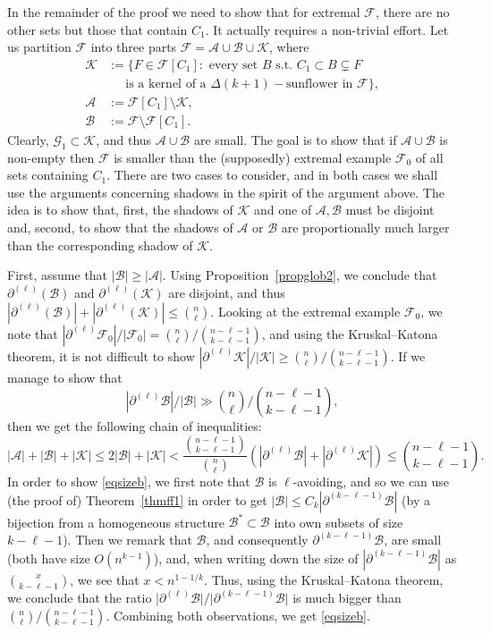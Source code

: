 \documentclass[graybox]{svmult}
\renewcommand{\le}{\leqslant}
\renewcommand{\ge}{\geqslant}
\newcommand{\ff}{\mathcal{F}}
\newcommand{\m}{\mathcal}
\begin{document}
In the remainder of the proof we need to show that for extremal $\ff$, there are no other sets but those that contain $C_1$. It actually requires a non-trivial effort. Let us partition $\ff$ into three parts $\ff = \mathcal A\cup \mathcal B\cup \mathcal K$, where \begin{align*}\mathcal K&:=\{F\in \ff[C_1]: \text{ every set }B\text { s.t. } C_1\subset B\subsetneq F \\ &\ \ \ \ \ \text{ is a kernel of a }\Delta(k+1)-\text{sunflower in } \ff\},\\
\m A&:=\ff[C_1]\setminus \m K,\\
\m B&:=\ff\setminus \ff[C_1].
\end{align*}
Clearly, $\m G_1\subset \m K$, and thus $\m A\cup \m B$ are small. The goal is to show that if $\m A\cup \m B$ is non-empty then $\ff$ is smaller than the (supposedly) extremal example $\ff_0$ of all sets containing $C_1$. There are two cases to consider, and in both cases we shall use the arguments concerning shadows in the spirit of the argument above. The idea is to show that, first, the shadows of $\m K$ and one of $\m A, \m B$ must be disjoint and, second, to show that the shadows of $\m A$ or $\m B$ are proportionally much larger than the corresponding shadow of $\m K$.

First, assume that $|\m B|\ge |\m A|$. Using Proposition~\ref{propglob2}, we conclude that $\partial^{(\ell)}(\m B)$ and $\partial^{(\ell)}(\m K)$ are disjoint, and thus $|\partial^{(\ell)}(\m B)| +|\partial^{(\ell)}(\m K)|\le {n\choose \ell}$. Looking at the extremal example $\ff_0$, we note that $|\partial^{(\ell)}\ff_0|/|\ff_0| = {n\choose \ell}/{n-\ell-1\choose k-\ell-1}$, and using the Kruskal--Katona theorem, it is not difficult to show  $|\partial^{(\ell)}\m K|/|\m K| \ge {n\choose \ell}/{n-\ell-1\choose k-\ell-1}$. If we manage to show that \begin{equation}\label{eqsizeb}|\partial^{(\ell)}\m B|/|\m B| \gg {n\choose \ell}/{n-\ell-1\choose k-\ell-1},\end{equation} then we get the following chain of inequalities:
$$|\m A|+|\m B|+|\m K|\le 2|\m B|+|\m K|<\frac{{n-\ell-1\choose k-\ell-1}}{{n\choose \ell}}\left(|\partial^{(\ell)}\m B|+|\partial^{(\ell)}\m K|\right)\le {n-\ell-1\choose k-\ell-1}.$$
In order to show \eqref{eqsizeb}, we first note that $\m B$ is $\ell$-avoiding, and so we can use (the proof of) Theorem~\ref{thmff1} in order to get $|\m B|\le C_k |\partial^{(k-\ell-1)}\m B|$ (by a bijection from a homogeneous structure $\m B^*\subset \m B$ into own subsets of size $k-\ell-1$). Then we remark that $\m B$, and consequently $\partial^{(k-\ell-1)}\m B$, are  small (both have size $O(n^{k-1})$), and, when writing down the size of $|\partial^{(k-\ell-1)}\m B|$ as ${x\choose k-\ell-1}$, we see that $x<n^{1-1/k}$. Thus, using the Kruskal--Katona theorem, we conclude that the ratio |$\partial^{(\ell)}\m B|/|\partial^{(k-\ell-1)}\m B|$ is much bigger  than  ${n\choose \ell}/{n-\ell-1\choose k-\ell-1}$. Combining both observations, we get  \eqref{eqsizeb}.
\end{document}
